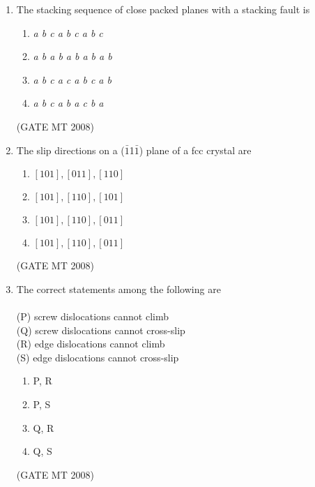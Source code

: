 \documentclass[11pt, letterpaper]{article}
\theoremstyle{remark}
\begin{document}
\begin{enumerate}[label=Q.\arabic*]
\item The stacking sequence of close packed planes with a stacking fault is
\vspace{-0.9em}
\begin{multicols}{2}
      \begin{enumerate}
        \item \textit{a b c a b c a b c}
        \item \textit{a b a b a b a b a b}
        \item \textit{a b c a c a b c a b}
        \item \textit{a b c a b a c b a}
      \end{enumerate}
    \end{multicols}
\vspace{-5mm}
\hfill(GATE MT 2008)

\item The slip directions on a ($\bar{1}$1$\bar{1}$) plane of a fcc crystal are
\vspace{-0.9em}
\begin{multicols}{2}
      \begin{enumerate}
        \item $[101], [011], [110]$
        \item $[101], [110], [101]$
        \item $[101], [110], [011]$
        \item $[101], [110], [011]$
      \end{enumerate}
    \end{multicols}
\vspace{-5mm}
\hfill(GATE MT 2008)

\item The correct statements among the following are\\ \\
(P) screw dislocations cannot climb\\(Q) screw dislocations cannot cross-slip\\ (R) edge dislocations cannot climb\\(S) edge dislocations cannot cross-slip
\vspace{-0.9em}
 \begin{multicols}{4}
  \begin{enumerate}[label=(\MakeUppercase{\alph*})]
      \item P, R
  \item P, S
  \item Q, R
  \item Q, S
 \end{enumerate}
\end{multicols}
\vspace{-5mm}
\hfill(GATE MT 2008)


\end{enumerate}
\end{document}
